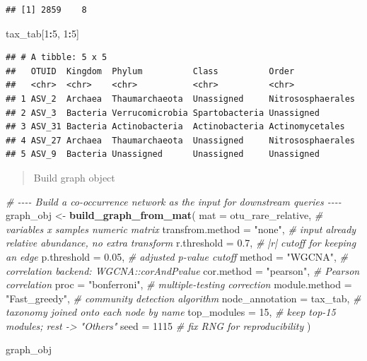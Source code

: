 \documentclass[
]{book}
\newenvironment{Shaded}{\begin{snugshade}}{\end{snugshade}}
\newcommand{\AttributeTok}[1]{\textcolor[rgb]{0.13,0.29,0.53}{#1}}
\newcommand{\CommentTok}[1]{\textcolor[rgb]{0.56,0.35,0.01}{\textit{#1}}}
\newcommand{\DecValTok}[1]{\textcolor[rgb]{0.00,0.00,0.81}{#1}}
\newcommand{\FloatTok}[1]{\textcolor[rgb]{0.00,0.00,0.81}{#1}}
\newcommand{\FunctionTok}[1]{\textcolor[rgb]{0.13,0.29,0.53}{\textbf{#1}}}
\newcommand{\NormalTok}[1]{#1}
\newcommand{\OtherTok}[1]{\textcolor[rgb]{0.56,0.35,0.01}{#1}}
\newcommand{\SpecialCharTok}[1]{\textcolor[rgb]{0.81,0.36,0.00}{\textbf{#1}}}
\newcommand{\StringTok}[1]{\textcolor[rgb]{0.31,0.60,0.02}{#1}}
\begin{document}
\begin{verbatim}
## [1] 2859    8
\end{verbatim}

\begin{Shaded}
\begin{Highlighting}[]
\NormalTok{tax\_tab[}\DecValTok{1}\SpecialCharTok{:}\DecValTok{5}\NormalTok{, }\DecValTok{1}\SpecialCharTok{:}\DecValTok{5}\NormalTok{]}
\end{Highlighting}
\end{Shaded}

\begin{verbatim}
## # A tibble: 5 x 5
##   OTUID  Kingdom  Phylum          Class          Order            
##   <chr>  <chr>    <chr>           <chr>          <chr>            
## 1 ASV_2  Archaea  Thaumarchaeota  Unassigned     Nitrososphaerales
## 2 ASV_3  Bacteria Verrucomicrobia Spartobacteria Unassigned       
## 3 ASV_31 Bacteria Actinobacteria  Actinobacteria Actinomycetales  
## 4 ASV_27 Archaea  Thaumarchaeota  Unassigned     Nitrososphaerales
## 5 ASV_9  Bacteria Unassigned      Unassigned     Unassigned
\end{verbatim}

\begin{quote}
Build graph object
\end{quote}

\begin{Shaded}
\begin{Highlighting}[]
\CommentTok{\# {-}{-}{-}{-} Build a co{-}occurrence network as the input for downstream queries {-}{-}{-}{-}}
\NormalTok{graph\_obj }\OtherTok{\textless{}{-}} \FunctionTok{build\_graph\_from\_mat}\NormalTok{(}
  \AttributeTok{mat              =}\NormalTok{ otu\_rare\_relative,  }\CommentTok{\# variables x samples numeric matrix}
  \AttributeTok{transfrom.method =} \StringTok{"none"}\NormalTok{,             }\CommentTok{\# input already relative abundance, no extra transform}
  \AttributeTok{r.threshold      =} \FloatTok{0.7}\NormalTok{,                }\CommentTok{\# |r| cutoff for keeping an edge}
  \AttributeTok{p.threshold      =} \FloatTok{0.05}\NormalTok{,               }\CommentTok{\# adjusted p{-}value cutoff}
  \AttributeTok{method           =} \StringTok{"WGCNA"}\NormalTok{,            }\CommentTok{\# correlation backend: WGCNA::corAndPvalue}
  \AttributeTok{cor.method       =} \StringTok{"pearson"}\NormalTok{,          }\CommentTok{\# Pearson correlation}
  \AttributeTok{proc             =} \StringTok{"bonferroni"}\NormalTok{,       }\CommentTok{\# multiple{-}testing correction}
  \AttributeTok{module.method    =} \StringTok{"Fast\_greedy"}\NormalTok{,      }\CommentTok{\# community detection algorithm}
  \AttributeTok{node\_annotation  =}\NormalTok{ tax\_tab,            }\CommentTok{\# taxonomy joined onto each node by name}
  \AttributeTok{top\_modules      =} \DecValTok{15}\NormalTok{,                 }\CommentTok{\# keep top{-}15 modules; rest {-}\textgreater{} "Others"}
  \AttributeTok{seed             =} \DecValTok{1115}                \CommentTok{\# fix RNG for reproducibility}
\NormalTok{)}

\NormalTok{graph\_obj}
\end{Highlighting}
\end{Shaded}
\end{document}
